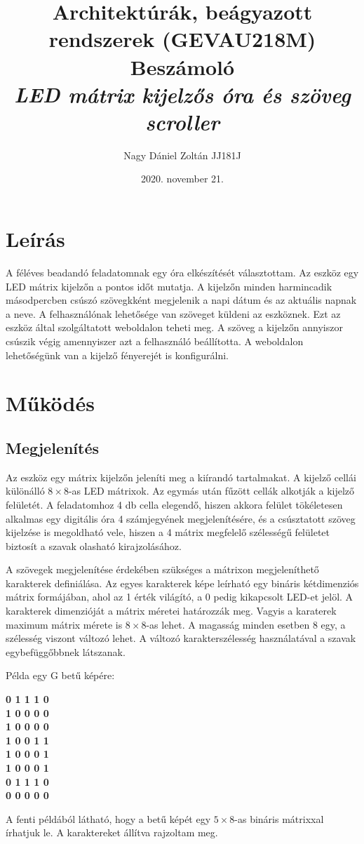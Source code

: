 \documentclass[a4paper, 12pt]{article}
\title{Architektúrák, beágyazott rendszerek (GEVAU218M)\\\LARGE{\textbf{Beszámoló}}\\ \bigskip \Large{\textit{LED mátrix kijelzős óra és szöveg scroller}}}
\date{2020. november 21.}
\author{Nagy Dániel Zoltán JJ181J}
\begin{document}
\maketitle

\section{Leírás}
A féléves beadandó feladatomnak egy óra elkészítését választottam.
Az eszköz egy LED mátrix kijelzőn a pontos időt mutatja. A kijelzőn minden harmincadik másodpercben csúszó szövegkként megjelenik a napi dátum és az aktuális napnak a neve. A felhasználónak lehetősége van szöveget küldeni az eszköznek. Ezt az eszköz által szolgáltatott weboldalon teheti meg. A szöveg a kijelzőn annyiszor csúszik végig amennyiszer azt a felhasználó beállította. A weboldalon lehetőségünk van a kijelző fényerejét is konfigurálni.


\section{Működés}

\subsection{Megjelenítés}
Az eszköz egy mátrix kijelzőn jeleníti meg a kiírandó tartalmakat. A kijelző cellái különálló $8\times 8$-as LED mátrixok. Az egymás után fűzött cellák alkotják a kijelző felületét. A feladatomhoz 4 db cella elegendő, hiszen akkora felület tökéletesen alkalmas egy digitális óra 4 számjegyének megjelenítésére, és a csúsztatott szöveg kijelzése is megoldható vele, hiszen a 4 mátrix megfelelő szélességű felületet biztosít a szavak olasható kirajzolásához.

A szövegek megjelenítése érdekében szükséges a mátrixon megjeleníthető karakterek definiálása. Az egyes karakterek képe leírható egy bináris kétdimenziós mátrix formájában, ahol az 1 érték világító, a 0 pedig kikapcsolt LED-et jelöl.
A karakterek dimenzióját a mátrix méretei határozzák meg. Vagyis a karaterek maximum mátrix mérete is $8\times 8$-as lehet. A magasság minden esetben 8 egy, a szélesség viszont változó lehet. A változó karakterszélesség használatával a szavak egybefüggőbbnek látszanak.

Példa egy G betű képére:
\begin{center}
\textbf{0 1 1 1 0\\
1 0 0 0 0\\
1 0 0 0 0\\
1 0 0 1 1\\
1 0 0 0 1\\
1 0 0 0 1\\
0 1 1 1 0\\
0 0 0 0 0}
\end{center}
A fenti példából látható, hogy a betű képét egy $5\times 8$-as bináris mátrixxal írhatjuk le. A karaktereket állítva rajzoltam meg.
\end{document}
